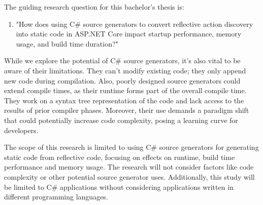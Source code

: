 The guiding research question for this bachelor's thesis is:

\begin{enumerate}[label=\textbf{RQ.\arabic*}:, leftmargin=*, labelindent=1em]
\item "How does using C\# source generators to convert reflective action discovery into static code in ASP.NET Core impact startup performance, memory usage, and build time duration?"
\end{enumerate}

While we explore the potential of C\# source generators, it's also vital to be aware of their limitations. They can't modify existing code; they only append new code during compilation. Also, poorly designed source generators could extend compile times, as their runtime forms part of the overall compile time. They work on a syntax tree representation of the code and lack access to the results of prior compiler phases. Moreover, their use demands a paradigm shift that could potentially increase code complexity, posing a learning curve for developers.

The scope of this research is limited to using C\# source generators for generating static code from reflective code, focusing on effects on runtime, build time performance and memory usage. The research will not consider factors like code complexity or other potential source generator uses. Additionally, this study will be limited to C\# applications without considering applications written in different programming languages.